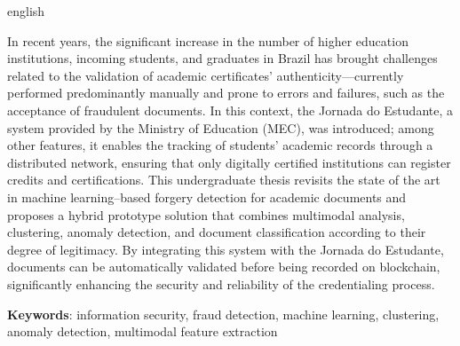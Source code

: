 \begin{resumo}[Abstract]
	\SingleSpacing
	\begin{otherlanguage*}{english}

        In recent years, the significant increase in the number of higher education institutions, incoming students, and graduates in Brazil has brought challenges related to the validation of academic certificates’ authenticity—currently performed predominantly manually and prone to errors and failures, such as the acceptance of fraudulent documents. In this context, the Jornada do Estudante, a system provided by the Ministry of Education (MEC), was introduced; among other features, it enables the tracking of students’ academic records through a distributed network, ensuring that only digitally certified institutions can register credits and certifications. This undergraduate thesis revisits the state of the art in machine learning–based forgery detection for academic documents and proposes a hybrid prototype solution that combines multimodal analysis, clustering, anomaly detection, and document classification according to their degree of legitimacy. By integrating this system with the Jornada do Estudante, documents can be automatically validated before being recorded on blockchain, significantly enhancing the security and reliability of the credentialing process.
		
		\textbf{Keywords}: information security, fraud detection, machine learning, clustering, anomaly detection, multimodal feature extraction
	\end{otherlanguage*}
\end{resumo}




% 
%
%  


